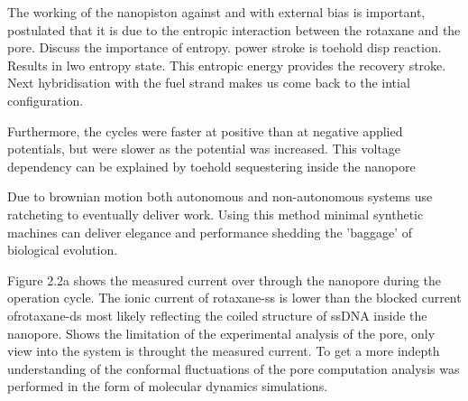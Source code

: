 The working of the nanopiston against and with external bias is important, postulated
that it is due to the entropic interaction between the rotaxane and the pore.
Discuss the importance of entropy. power stroke is toehold disp reaction. Results in lwo
entropy state. This entropic energy provides the recovery stroke. Next hybridisation with
the fuel strand makes us come back to the intial configuration.

Furthermore, the cycles were faster at positive than at negative applied potentials, but
were slower as the potential was increased. This voltage dependency can be explained by
toehold sequestering inside the nanopore

Due to brownian motion both autonomous and non-autonomous systems use ratcheting to
eventually deliver work. Using this method minimal synthetic machines can deliver
elegance and performance shedding the 'baggage' of biological evolution.

Figure 2.2a shows the measured current over through the nanopore during the operation
cycle. The ionic current of rotaxane-ss is lower than the blocked current ofrotaxane-ds
most likely reflecting the coiled structure of ssDNA inside the nanopore. Shows the
limitation of the experimental analysis of the pore, only view into the system is
throught the measured current. To get a more indepth understanding of the conformal
fluctuations of the pore computation analysis was performed in the form of molecular
dynamics simulations.





